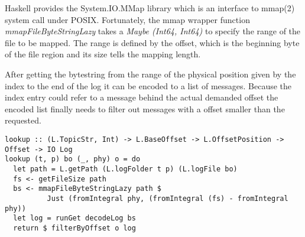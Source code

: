 Haskell provides the System.IO.MMap library which is an interface to mmap(2)
system call under POSIX. Fortunately, the mmap wrapper function
\textit{mmapFileByteStringLazy} takes a \textit{Maybe (Int64, Int64)} to specify
the range of the file to be mapped.  The range is defined by the offset, which
is the beginning byte of the file region and its size tells the mapping length.

After getting the bytestring from the range of the physical position given by
the index to the end of the log it can be encoded to a list of messages.
Because the index entry could refer to a message behind the actual demanded
offset the encoded list finally needs to filter out messages with a offset
smaller than the requested.

\begin{lstlisting}
lookup :: (L.TopicStr, Int) -> L.BaseOffset -> L.OffsetPosition -> Offset -> IO Log
lookup (t, p) bo (_, phy) o = do
  let path = L.getPath (L.logFolder t p) (L.logFile bo)
  fs <- getFileSize path
  bs <- mmapFileByteStringLazy path $ 
          Just (fromIntegral phy, (fromIntegral (fs) - fromIntegral phy))
  let log = runGet decodeLog bs
  return $ filterByOffset o log
\end{lstlisting}

